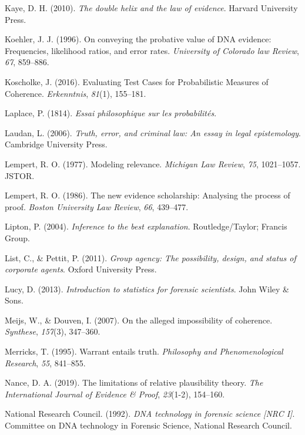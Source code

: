 \documentclass[11pt,dvipsnames,enabledeprecatedfontcommands]{scrartcl}
\begin{document}
\hypertarget{ref-Kaye2010The-Double-Heli}{}
Kaye, D. H. (2010). \emph{The double helix and the law of evidence}.
Harvard University Press.

\hypertarget{ref-Koehler1996On-Conveying-th}{}
Koehler, J. J. (1996). On conveying the probative value of DNA evidence:
Frequencies, likelihood ratios, and error rates. \emph{University of
Colorado law Review}, \emph{67}, 859--886.

\hypertarget{ref-koscholke2016evaluating}{}
Koscholke, J. (2016). Evaluating Test Cases for Probabilistic Measures
of Coherence. \emph{Erkenntnis}, \emph{81}(1), 155--181.

\hypertarget{ref-Laplace1814}{}
Laplace, P. (1814). \emph{Essai philosophique sur les probabilités}.

\hypertarget{ref-laudan2006truth}{}
Laudan, L. (2006). \emph{Truth, error, and criminal law: An essay in
legal epistemology}. Cambridge University Press.

\hypertarget{ref-lempert1977modeling}{}
Lempert, R. O. (1977). Modeling relevance. \emph{Michigan Law Review},
\emph{75}, 1021--1057. JSTOR.

\hypertarget{ref-Lempert1986}{}
Lempert, R. O. (1986). The new evidence scholarship: Analysing the
process of proof. \emph{Boston University Law Review}, \emph{66},
439--477.

\hypertarget{ref-Lipton2004-LIPITT}{}
Lipton, P. (2004). \emph{Inference to the best explanation}.
Routledge/Taylor; Francis Group.

\hypertarget{ref-List2011Group}{}
List, C., \& Pettit, P. (2011). \emph{Group agency: The possibility,
design, and status of corporate agents}. Oxford University Press.

\hypertarget{ref-lucy2013introduction}{}
Lucy, D. (2013). \emph{Introduction to statistics for forensic
scientists}. John Wiley \& Sons.

\hypertarget{ref-meijs2007}{}
Meijs, W., \& Douven, I. (2007). On the alleged impossibility of
coherence. \emph{Synthese}, \emph{157}(3), 347--360.

\hypertarget{ref-Merricks1995}{}
Merricks, T. (1995). Warrant entails truth. \emph{Philosophy and
Phenomenological Research}, \emph{55}, 841--855.

\hypertarget{ref-nance2019LimitationsRelativePlausibility}{}
Nance, D. A. (2019). The limitations of relative plausibility theory.
\emph{The International Journal of Evidence \& Proof}, \emph{23}(1-2),
154--160.

\hypertarget{ref-NRCI1992}{}
National Research Council. (1992). \emph{DNA technology in forensic
science \textup{{[}NRC I{]}}}. Committee on DNA technology in Forensic
Science, National Research Council.
\end{document}

